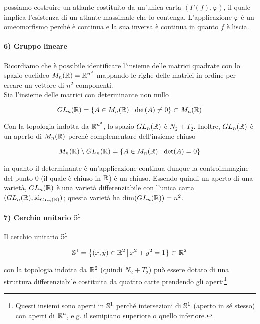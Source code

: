 possiamo costruire un atlante costituito da un'unica carta $ (\Gamma(f),\varphi) $, il quale implica l'esistenza di un atlante massimale che lo contenga. L'applicazione $ \varphi $ è un omeomorfismo perché è continua e la sua inversa è continua in quanto $ f $ è liscia.

\paragraph{6) Gruppo lineare}

Ricordiamo che è possibile identificare l'insieme delle matrici quadrate con lo spazio euclideo $ M_{n}(\R) = \R^{n^{2}} $ mappando le righe delle matrici in ordine per creare un vettore di $ n^{2} $ componenti. \\
Sia l'insieme delle matrici con determinante non nullo

\begin{equation}
	GL_{n}(\R) = \{ A \in M_{n}(\R) \mid \det(A) \neq 0 \} \subset M_{n}(\R)
\end{equation}

Con la topologia indotta da $ \R^{n^{2}} $, lo spazio $ GL_{n}(\R) $ è $ N_{2} + T_{2} $. Inoltre, $ GL_{n}(\R) $ è un aperto di $ M_{n}(\R) $ perché complementare dell'insieme chiuso

\begin{equation}
	 M_{n}(\R) \setminus GL_{n}(\R) = \{ A \in M_{n}(\R) \mid \det(A) = 0 \}
\end{equation}

in quanto il determinante è un'applicazione continua dunque la controimmagine del punto $ 0 $ (il quale è chiuso in $ \R $) è un chiuso. Essendo quindi un aperto di una varietà, $ GL_{n}(\R) $ è una varietà differenziabile con l'unica carta $ (GL_{n}(\R),\id_{GL_{n}(\R)}) $; questa varietà ha $ \dim(GL_{n}(\R)) = n^{2} $.

\paragraph{7) Cerchio unitario $ \S^{1} $}\label{example:diff-man-s1}

Il cerchio unitario $ \S^{1} $

\begin{equation}
	\S^{1} = \left\{ (x,y) \in \R^{2} \st x^{2} + y^{2} = 1 \right\} \subset \R^{2}
\end{equation}

con la topologia indotta da $ \R^{2} $ (quindi $ N_{2} + T_{2} $) può essere dotato di una struttura differenziabile costituita da quattro carte prendendo gli aperti\footnote{%
	Questi insiemi sono aperti in $ \S^{1} $ perché intersezioni di $ \S^{1} $ (aperto in sé stesso) con aperti di $ \R^{n} $, e.g. il semipiano superiore o quello inferiore.}

